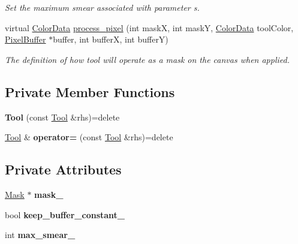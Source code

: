 \begin{DoxyCompactItemize}
\begin{DoxyCompactList}\small\item\em Set the maximum smear associated with parameter s. \end{DoxyCompactList}\item 
virtual \hyperlink{classimage__tools_1_1ColorData}{Color\+Data} \hyperlink{classimage__tools_1_1Tool_a9e601f030f0956796810616445e395f0}{process\+\_\+pixel} (int maskX, int maskY, \hyperlink{classimage__tools_1_1ColorData}{Color\+Data} tool\+Color, \hyperlink{classimage__tools_1_1PixelBuffer}{Pixel\+Buffer} $\ast$buffer, int bufferX, int bufferY)
\begin{DoxyCompactList}\small\item\em The definition of how tool will operate as a mask on the canvas when applied. \end{DoxyCompactList}\end{DoxyCompactItemize}
\subsection*{Private Member Functions}
\begin{DoxyCompactItemize}
\item 
{\bfseries Tool} (const \hyperlink{classimage__tools_1_1Tool}{Tool} \&rhs)=delete\hypertarget{classimage__tools_1_1Tool_adc8752459db983c80f255a8d5dc0a94b}{}\label{classimage__tools_1_1Tool_adc8752459db983c80f255a8d5dc0a94b}

\item 
\hyperlink{classimage__tools_1_1Tool}{Tool} \& {\bfseries operator=} (const \hyperlink{classimage__tools_1_1Tool}{Tool} \&rhs)=delete\hypertarget{classimage__tools_1_1Tool_a61c5da6d429a933acf7d3932c6368e5a}{}\label{classimage__tools_1_1Tool_a61c5da6d429a933acf7d3932c6368e5a}

\end{DoxyCompactItemize}
\subsection*{Private Attributes}
\begin{DoxyCompactItemize}
\item 
\hyperlink{classimage__tools_1_1Mask}{Mask} $\ast$ {\bfseries mask\+\_\+}\hypertarget{classimage__tools_1_1Tool_a318a254280db4cc65ab7e185b1c41db4}{}\label{classimage__tools_1_1Tool_a318a254280db4cc65ab7e185b1c41db4}

\item 
bool {\bfseries keep\+\_\+buffer\+\_\+constant\+\_\+}\hypertarget{classimage__tools_1_1Tool_acbe9c5c5e9f8dca610e5f00ceb2165cb}{}\label{classimage__tools_1_1Tool_acbe9c5c5e9f8dca610e5f00ceb2165cb}

\item 
int {\bfseries max\+\_\+smear\+\_\+}\hypertarget{classimage__tools_1_1Tool_a302c8f65693346d76d026d4306ce293e}{}\label{classimage__tools_1_1Tool_a302c8f65693346d76d026d4306ce293e}

\end{DoxyCompactItemize}


